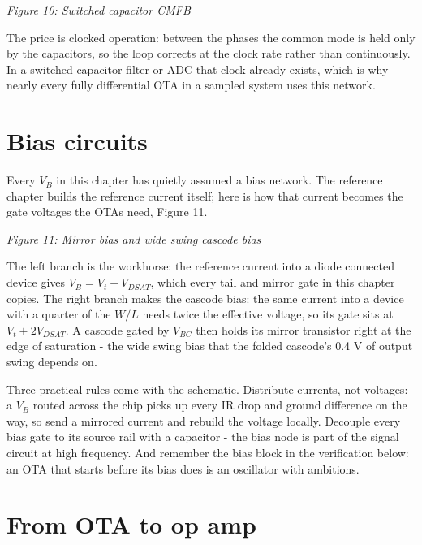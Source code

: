 {
\centering
{}
}

\emph{Figure 10: Switched capacitor CMFB}

The price is clocked operation: between the phases the common mode is
held only by the capacitors, so the loop corrects at the clock rate
rather than continuously. In a switched capacitor filter or ADC that
clock already exists, which is why nearly every fully differential OTA
in a sampled system uses this network.

\section{Bias circuits}\label{bias-circuits}

Every \(V_B\) in this chapter has quietly assumed a bias network. The
reference chapter builds the reference current itself; here is how that
current becomes the gate voltages the OTAs need, Figure 11.


{
\centering
{}
}

\emph{Figure 11: Mirror bias and wide swing cascode bias}

The left branch is the workhorse: the reference current into a diode
connected device gives \(V_B = V_t + V_{DSAT}\), which every tail and
mirror gate in this chapter copies. The right branch makes the cascode
bias: the same current into a device with a quarter of the \(W/L\) needs
twice the effective voltage, so its gate sits at \(V_t + 2V_{DSAT}\). A
cascode gated by \(V_{BC}\) then holds its mirror transistor right at
the edge of saturation - the wide swing bias that the folded cascode's
0.4 V of output swing depends on.

Three practical rules come with the schematic. Distribute currents, not
voltages: a \(V_B\) routed across the chip picks up every IR drop and
ground difference on the way, so send a mirrored current and rebuild the
voltage locally. Decouple every bias gate to its source rail with a
capacitor - the bias node is part of the signal circuit at high
frequency. And remember the bias block in the verification below: an OTA
that starts before its bias does is an oscillator with ambitions.

\section{From OTA to op amp}\label{from-ota-to-op-amp}

